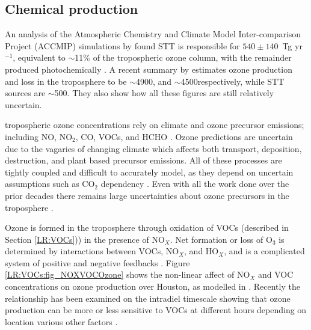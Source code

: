     
  
  \subsection{Chemical production}
    An analysis of the Atmospheric Chemistry and Climate Model Inter-comparison Project (ACCMIP) simulations by \cite{Young2013} found STT is responsible for $540\pm140$~Tg yr$^{-1}$, equivalent to $\sim$11\% of the tropospheric ozone column, with the remainder produced photochemically \citep{Monks2015}.
    A recent summary by \cite{Young2018} estimates ozone production and loss in the troposphere to be $\sim$4900\tgpyr, and $\sim$4500\tgpyr respectively, while STT sources are $\sim$500\tgpyr. 
    They also show how all these figures are still relatively uncertain.
    
    tropospheric ozone concentrations rely on climate and ozone precursor emissions; including NO, NO$_2$, CO, VOCs, and HCHO \citep{Atkinson2000, Young2013, Marvin2017}. 
    Ozone predictions are uncertain due to the vagaries of changing climate which affects both transport, deposition, destruction, and plant based precursor emissions.
    All of these processes are tightly coupled and difficult to accurately model, as they depend on uncertain assumptions such as CO$_2$ dependency \citep{Young2013}.
    Even with all the work done over the prior decades there remains large uncertainties about ozone precursors in the troposphere \citep{Mazzuca2016}.
    
    Ozone is formed in the troposphere through oxidation of VOCs (described in Section \ref{LR:VOCs})) in the presence of NO$_X$.
    Net formation or loss of O$_3$ is determined by interactions between VOCs, NO$_X$, and HO$_X$, and is a complicated system of positive and negative feedbacks \citep{Atkinson2000}.
    Figure \ref{LR:VOCs:fig_NOXVOCOzone} shows the non-linear affect of NO$_X$ and VOC concentrations on ozone production over Houston, as modelled in \cite{Mazzuca2016}.
    Recently the relationship has been examined on the intradiel timescale showing that ozone production can be more or less sensitive to VOCs at different hours depending on location various other factors \citep{Mazzuca2016}.
    
